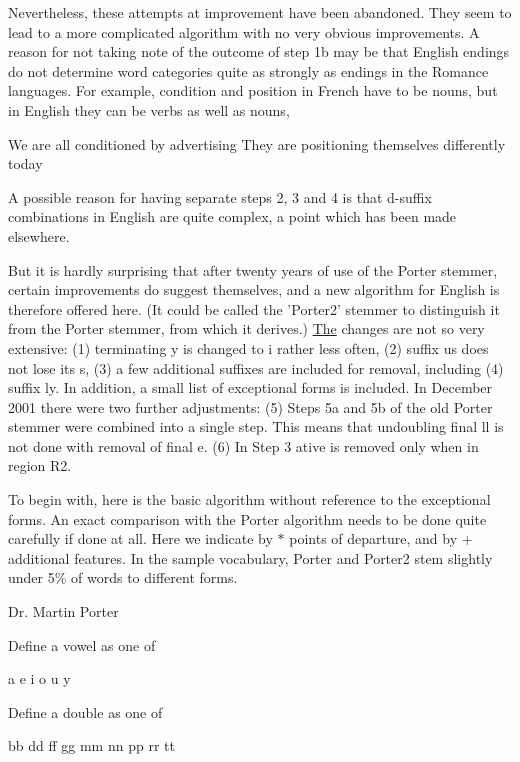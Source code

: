 Nevertheless, these attempts at improvement have been abandoned. They seem to lead to a more complicated algorithm with no very obvious improvements. A reason for not taking note of the outcome of step 1b may be that English endings do not determine word categories quite as strongly as endings in the Romance languages. For example, condition and position in French have to be nouns, but in English they can be verbs as well as nouns,

We are all conditioned by advertising They are positioning themselves differently today

A possible reason for having separate steps 2, 3 and 4 is that d-\/suffix combinations in English are quite complex, a point which has been made elsewhere.

But it is hardly surprising that after twenty years of use of the Porter stemmer, certain improvements do suggest themselves, and a new algorithm for English is therefore offered here. (It could be called the 'Porter2' stemmer to distinguish it from the Porter stemmer, from which it derives.) \hyperlink{class_the}{The} changes are not so very extensive\-: (1) terminating y is changed to i rather less often, (2) suffix us does not lose its s, (3) a few additional suffixes are included for removal, including (4) suffix ly. In addition, a small list of exceptional forms is included. In December 2001 there were two further adjustments\-: (5) Steps 5a and 5b of the old Porter stemmer were combined into a single step. This means that undoubling final ll is not done with removal of final e. (6) In Step 3 ative is removed only when in region R2.

To begin with, here is the basic algorithm without reference to the exceptional forms. An exact comparison with the Porter algorithm needs to be done quite carefully if done at all. Here we indicate by $\ast$ points of departure, and by + additional features. In the sample vocabulary, Porter and Porter2 stem slightly under 5\% of words to different forms.

Dr. Martin Porter

Define a vowel as one of
\begin{DoxyItemize}
\item a e i o u y
\end{DoxyItemize}

Define a double as one of
\begin{DoxyItemize}
\item bb dd ff gg mm nn pp rr tt
\end{DoxyItemize}

